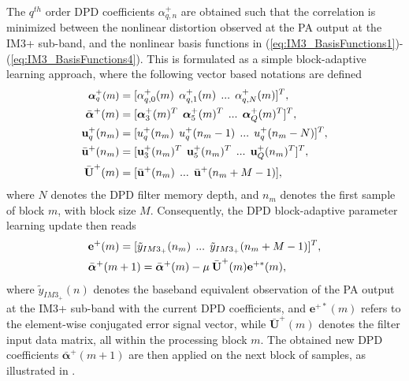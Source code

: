 The $q^{th}$ order DPD coefficients $\alpha^+_{q,n}$ are obtained such that the correlation is minimized between the nonlinear distortion observed at the PA output at the IM3+ sub-band, and the nonlinear basis functions in (\ref{eq:IM3_BasisFunctions1})-(\ref{eq:IM3_BasisFunctions4}). This is formulated as a simple block-adaptive learning approach, where the following vector based notations are defined
\begin{align}
\small
\boldsymbol{\alpha}^+_q(m) &= [\alpha^+_{q,0}(m)\:\:\alpha^+_{q,1}(m)\:\: ... \:\: \alpha^+_{q,N}(m)]^T, \\
\bar{\boldsymbol{\alpha}}^+(m) &= [\boldsymbol{\alpha}^+_3(m)^T \:\: \boldsymbol{\alpha}^+_5(m)^T \:\: ... \:\: \boldsymbol{\alpha}^+_Q(m)^T]^T, \\
\textbf{u}^+_q(n_m) &= [u^+_q(n_m)\:\:u^+_q(n_m-1) \:\: ... \:\: u^+_q(n_m-N)]^T, \\
\bar{\textbf{u}}^+(n_m) &= [\textbf{u}^+_3(n_m)^T \:\: \textbf{u}^+_5(n_m)^T  \:\: ... \:\: \textbf{u}^+_Q(n_m)^T ]^T, \\
\bar{\textbf{U}}^+(m) &= [\bar{\textbf{u}}^+(n_m) \:\: ... \:\: \bar{\textbf{u}}^+(n_m+M-1)],
\end{align}
\normalsize
where $N$ denotes the DPD filter memory depth, and $n_m$ denotes the first sample of block $m$, with block size $M$.
Consequently, the DPD block-adaptive parameter learning update then reads
\begin{align}
\small
&\textbf{e}^+(m) = [\tilde{y}_{IM3_+}(n_m) \:\: ... \:\: \tilde{y}_{IM3_+}(n_m+M-1)]^T, \\
&\bar{\boldsymbol{\alpha}}^+(m+1) = \bar{\boldsymbol{\alpha}}^+(m) - \mu \: \bar{\textbf{U}}^+(m)\textbf{e}^{+*}(m), 
\label{eq:BlockAdaptive}
\end{align}
\normalsize
where $\tilde{y}_{IM3_+}(n)$ denotes the baseband equivalent observation of the PA output at the IM3+ sub-band with the current DPD coefficients, and $\textbf{e}^{+*}(m)$ refers to the element-wise conjugated error signal vector, while $\bar{\textbf{U}}^+(m)$ denotes the filter input data matrix, all within the processing block $m$. 
The obtained new DPD coefficients $\bar{\boldsymbol{\alpha}}^+(m+1)$ are then applied on the next block of samples, as illustrated in \cite{Asilomar2015}.

